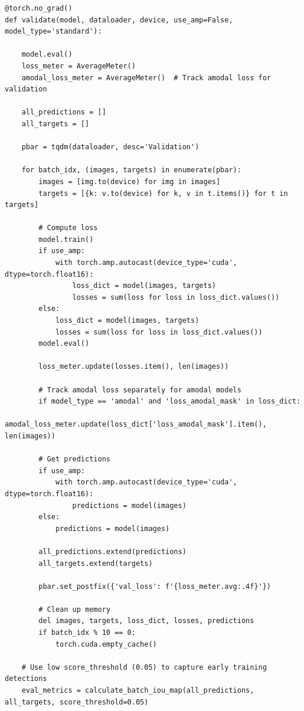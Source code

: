 \begin{lstlisting}[caption={Proses Evaluasi Model}, label={code:4.evaluasi_validate}]
@torch.no_grad()
def validate(model, dataloader, device, use_amp=False,                        model_type='standard'):

    model.eval()
    loss_meter = AverageMeter()
    amodal_loss_meter = AverageMeter()  # Track amodal loss for validation
    
    all_predictions = []
    all_targets = []
    
    pbar = tqdm(dataloader, desc='Validation')
    
    for batch_idx, (images, targets) in enumerate(pbar):
        images = [img.to(device) for img in images]
        targets = [{k: v.to(device) for k, v in t.items()} for t in targets]
        
        # Compute loss
        model.train()
        if use_amp:
            with torch.amp.autocast(device_type='cuda', dtype=torch.float16):
                loss_dict = model(images, targets)
                losses = sum(loss for loss in loss_dict.values())
        else:
            loss_dict = model(images, targets)
            losses = sum(loss for loss in loss_dict.values())
        model.eval()
        
        loss_meter.update(losses.item(), len(images))
        
        # Track amodal loss separately for amodal models
        if model_type == 'amodal' and 'loss_amodal_mask' in loss_dict:
            amodal_loss_meter.update(loss_dict['loss_amodal_mask'].item(), len(images))
        
        # Get predictions
        if use_amp:
            with torch.amp.autocast(device_type='cuda', dtype=torch.float16):
                predictions = model(images)
        else:
            predictions = model(images)
            
        all_predictions.extend(predictions)
        all_targets.extend(targets)
        
        pbar.set_postfix({'val_loss': f'{loss_meter.avg:.4f}'})
        
        # Clean up memory
        del images, targets, loss_dict, losses, predictions
        if batch_idx % 10 == 0:
            torch.cuda.empty_cache()
    
    # Use low score_threshold (0.05) to capture early training detections
    eval_metrics = calculate_batch_iou_map(all_predictions, all_targets, score_threshold=0.05)
    

\end{lstlisting}
